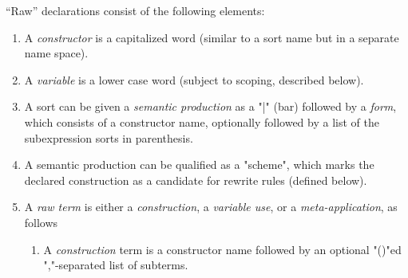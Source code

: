 \documentclass[11pt]{article} %
\begin{document}
\begin{manual}\label{man:raw}
  ``Raw'' declarations consist of the following elements:
  \begin{enumerate}

  \item A \emph{constructor} is a capitalized word (similar to a sort name but in a separate name
    space).

  \item A \emph{variable} is a lower case word (subject to scoping, described below).

  \item A sort can be given a \emph{semantic production} as a "|" (bar) followed by a \emph{form},
    which consists of a constructor name, optionally followed by a list of the subexpression sorts
    in parenthesis.


  \item A semantic production can be qualified as a "scheme", which marks the declared construction
    as a candidate for rewrite rules (defined below).

  \item A \emph{raw term} is either a \emph{construction}, a \emph{variable use}, or a
    \emph{meta-application}, as follows
    \begin{enumerate}

    \item A \emph{construction} term is a constructor name followed by an optional "()"ed
      ","-separated list of subterms.


\end{enumerate}
\end{enumerate}
\end{manual}
\end{document}
